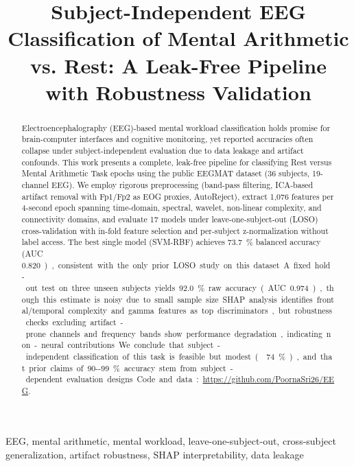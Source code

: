 \documentclass[conference]{IEEEtran}
\begin{document}
\title{Subject-Independent EEG Classification of Mental Arithmetic vs. Rest:
A Leak-Free Pipeline with Robustness Validation}

\author{
}

\maketitle

\begin{abstract}
Electroencephalography (EEG)-based mental workload classification holds promise for brain-computer interfaces and cognitive monitoring, yet reported accuracies often collapse under subject-independent evaluation due to data leakage and artifact confounds. This work presents a complete, leak-free pipeline for classifying Rest versus Mental Arithmetic Task epochs using the public EEGMAT dataset (36 subjects, 19-channel EEG). We employ rigorous preprocessing (band-pass filtering, ICA-based artifact removal with Fp1/Fp2 as EOG proxies, AutoReject), extract 1,076 features per 4-second epoch spanning time-domain, spectral, wavelet, non-linear complexity, and connectivity domains, and evaluate 17 models under leave-one-subject-out (LOSO) cross-validation with in-fold feature selection and per-subject z-normalization without label access. The best single model (SVM-RBF) achieves \SI{73.7}{\%} balanced accuracy (AUC \SI{0.820}), consistent with the only prior LOSO study on this dataset. A fixed hold-out test on three unseen subjects yields \SI{92.0}{\%} raw accuracy (AUC \SI{0.974}), though this estimate is noisy due to small sample size. SHAP analysis identifies frontal/temporal complexity and gamma features as top discriminators, but robustness checks excluding artifact-prone channels and frequency bands show performance degradation, indicating non-neural contributions. We conclude that subject-independent classification of this task is feasible but modest (\texttildelow\SI{74}{\%}), and that prior claims of \SI{90--99}{\%} accuracy stem from subject-dependent evaluation designs. Code and data: \url{https://github.com/PoornaSri26/EEG}.
\end{abstract}

\begin{IEEEkeywords}
EEG, mental arithmetic, mental workload, leave-one-subject-out, cross-subject generalization, artifact robustness, SHAP interpretability, data leakage
\end{IEEEkeywords}
\end{document}
